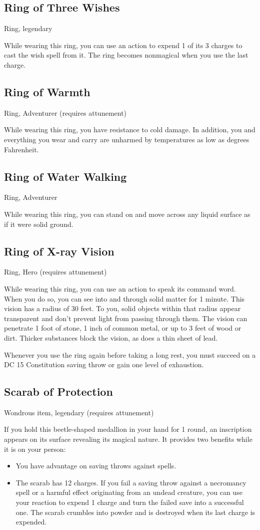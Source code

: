 \subsection{Ring of Three Wishes}
Ring, legendary 

While wearing this ring, you can use an action to expend 1 of its 3 charges to cast the wish spell from it. The ring becomes nonmagical when you use the last charge.

\subsection{Ring of Warmth}
Ring, Adventurer (requires attunement) 

While wearing this ring, you have resistance to cold damage. In addition, you and everything you wear and carry are unharmed by temperatures as low as  degrees Fahrenheit.

\subsection{Ring of Water Walking}
Ring, Adventurer 

While wearing this ring, you can stand on and move across any liquid surface as if it were solid ground.

\subsection{Ring of X-ray Vision}
Ring, Hero (requires attunement) 

While wearing this ring, you can use an action to speak its command word. When you do so, you can see into and through solid matter for 1 minute. This vision has a radius of 30 feet. To you, solid objects within that radius appear transparent and don't prevent light from passing through them. The vision can penetrate 1 foot of stone, 1 inch of common metal, or up to 3 feet of wood or dirt. Thicker substances block the vision, as does a thin sheet of lead.

Whenever you use the ring again before taking a long rest, you must succeed on a DC 15 Constitution saving throw or gain one level of exhaustion.

\subsection{Scarab of Protection}
Wondrous item, legendary (requires attunement)

If you hold this beetle-shaped medallion in your hand for 1 round, an inscription appears on its surface revealing its magical nature. It provides two benefits while it is on your person:
\begin{itemize}
\item You have advantage on saving throws against spells.
\item The scarab has 12 charges. If you fail a saving throw against a necromancy spell or a harmful effect originating from an undead creature, you can use your reaction to expend 1 charge and turn the failed save into a successful one. The scarab crumbles into powder and is destroyed when its last charge is expended.
\end{itemize}


